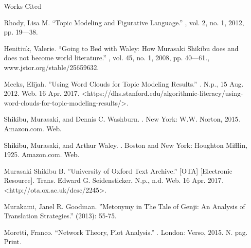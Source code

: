 \documentclass[12pt]{article}
\newcommand{\bibent}{\noindent \hangindent 40pt}
\newenvironment{workscited}{\newpage \begin{center} Works Cited \end{center}}{\newpage }
\begin{document}
\begin{flushleft}
\begin{spacing}{2.0}
\begin{workscited}
\bibent Rhody, Lisa M. ``Topic Modeling and Figurative Language.'' , vol. 2, no. 1, 2012, pp. 19---38.

\bibent Henitiuk, Valerie. ``Going to Bed with Waley: How Murasaki Shikibu does and does not become world literature.'' , vol. 45, no. 1, 2008, pp. 40---61., www.jstor.org/stable/25659632.

\bibent Meeks, Elijah. ''Using Word Clouds for Topic Modeling Results.'' . N.p., 15 Aug. 2012. Web. 16 Apr. 2017. <https://dhs.stanford.edu/algorithmic-literacy/using-word-clouds-for-topic-modeling-results/>.

\bibent Shikibu, Murasaki, and Dennis C. Washburn. . New York: W.W. Norton, 2015. Amazon.com. Web.

\bibent Shikibu, Murasaki, and Arthur Waley. . Boston and New York: Houghton Mifflin, 1925. Amazon.com. Web.

\bibent Murasaki Shikibu B. ''University of Oxford Text Archive.'' [OTA]  [Electronic Resource]. Trans. Edward G. Seidensticker. N.p., n.d. Web. 16 Apr. 2017. <http://ota.ox.ac.uk/desc/2245>.

\bibent Murakami, Janel R. Goodman. ''Metonymy in The Tale of Genji: An Analysis of Translation Strategies.''  (2013): 55-75.

\bibent Moretti, Franco. ``Network Theory, Plot Analysis.'' . London: Verso, 2015. N. pag. Print.

\end{workscited}



\end{spacing}
\end{flushleft}
\end{document}

